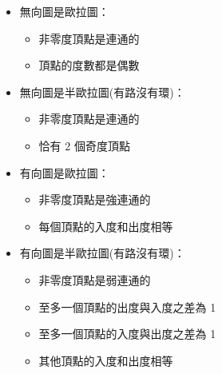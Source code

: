 \begin{itemize}
    \item 無向圖是歐拉圖：
    \begin{itemize}
        \item 非零度頂點是連通的
        \item 頂點的度數都是偶數
    \end{itemize}
    \item 無向圖是半歐拉圖(有路沒有環)：
    \begin{itemize}
        \item 非零度頂點是連通的
        \item 恰有 2 個奇度頂點
    \end{itemize}
    \item 有向圖是歐拉圖：
    \begin{itemize}
        \item 非零度頂點是強連通的
        \item 每個頂點的入度和出度相等
    \end{itemize}
    \item 有向圖是半歐拉圖(有路沒有環)：
    \begin{itemize}
        \item 非零度頂點是弱連通的
        \item 至多一個頂點的出度與入度之差為 1
        \item 至多一個頂點的入度與出度之差為 1
        \item 其他頂點的入度和出度相等
    \end{itemize}
\end{itemize}